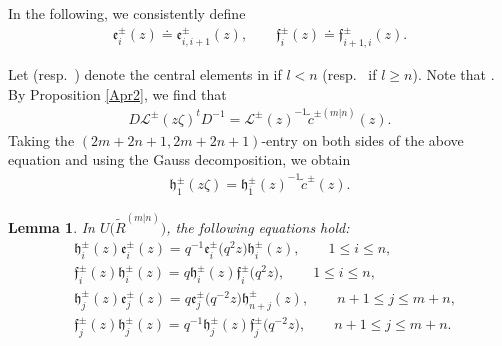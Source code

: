 \documentclass[pdftex]{sigma}
\numberwithin{equation}{section}
\newtheorem{Lemma}[Theorem]{Lemma}
\begin{document}
In the following, we consistently define
\begin{gather*}
 \mathfrak{e}_{i}^{\pm}(z)\doteq\mathfrak{e}_{i,i+1}^{\pm}(z), \qquad \mathfrak{f}_{i}^{\pm}(z)\doteq\mathfrak{f}_{i+1,i}^{\pm}(z).
\end{gather*}

Let  \big(resp.\ \big) denote the central elements in  if $l<n$ \big(resp.\  if $l\geq n$\big). Note that .
By Proposition \ref{Apr2}, we find that
\begin{gather*}%
 D\mathcal{L}^{\pm}(z\zeta)^tD^{-1}={\mathcal{L}^{\pm}(z)}^{-1}\widetilde{c}^{\pm(m|n)}(z).
\end{gather*}
Taking the $(2m+2n+1, 2m+2n+1)$-entry on both sides of the above equation and using the Gauss decomposition, we obtain
\begin{gather}\label{For2}
 \mathfrak{h}_1^{\pm}(z\zeta)={\mathfrak{h}_{\overline{1}}^{\pm}(z)}^{-1}\widetilde{c}^{\pm}(z).
\end{gather}

\begin{Lemma}\label{le3}
In $U\bigl(\widetilde{R}^{(m|n)}\bigr)$, the following equations hold:
\begin{align}
&\mathfrak{h}_i^{\pm}(z)\mathfrak{e}_i^{\pm}(z)=q^{-1}\mathfrak{e}_i^{\pm}\bigl(q^2z\bigr)\mathfrak{h}_i^{\pm}(z),\qquad 1\leq i\leq n,\label{For3} \\
&\mathfrak{f}_i^{\pm}(z)\mathfrak{h}_i^{\pm}(z)=q\mathfrak{h}_i^{\pm}(z)\mathfrak{f}_i^{\pm}\bigl(q^2z\bigr),\qquad 1\leq i\leq n, \nonumber\\
&\mathfrak{h}_{j}^{\pm}(z)\mathfrak{e}_{j}^{\pm}(z)=q\mathfrak{e}_{j}^{\pm}\bigl(q^{-2}z\bigr)\mathfrak{h}_{n+j}^{\pm}(z),\qquad n+1\leq j\leq m+n, \label{For4}\\
&\mathfrak{f}_{j}^{\pm}(z)\mathfrak{h}_{j}^{\pm}(z)=q^{-1}\mathfrak{h}_{j}^{\pm}(z) \mathfrak{f}_{j}^{\pm}\bigl(q^{-2}z\bigr),
\qquad n+1\leq j\leq m+n.\nonumber
\end{align}
\end{Lemma}
\end{document}

